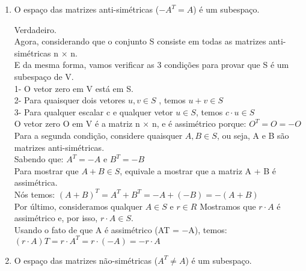 \documentclass[leqno]{article}
\numberwithin{equation}{section}
\begin{document}
\begin{enumerate}
\begin{enumerate}
			\item O espaço das matrizes anti-simétricas ($-A^T = A$) é um subespaço.
			
			\begin{sol} 
				Verdadeiro.\\
				\newline
				Agora, considerando que o conjunto S consiste em todas as matrizes anti-simétricas n × n.\\
				E da mesma forma, vamos verificar as 3 condições para provar que S é um subespaço de V.\\
				1- O vetor zero em V está em S.\\
				2- Para quaisquer dois vetores $u, v \in S$ , temos $u + v \in S$\\
				3- Para qualquer escalar c e qualquer vetor $u \in S$, temos $c \cdot u \in S$\\	
				\newline
				O vetor zero O em V é a matriz n × n, e é assimétrico porque: $O^T = O = −O$\\
				\newline
				Para a segunda condição, considere quaisquer $A, B \in S$, ou seja, A e B são matrizes anti-simétricas.\\
				Sabendo que: $A^T= −A$ e $B^T = −B$\\
				Para mostrar que $A + B \in S$, equivale a mostrar que a matriz A + B é assimétrica.\\
				Nós temos:
				$(A + B)^T = A^T + B^T = -A + (-B) = -(A + B)$\\
				\newline
				Por último, consideramos qualquer $A \in S$ e $r \in R$
				Mostramos que $r \cdot A$ é assimétrico e, por isso, $r \cdot A \in S$.\\
				\newline
				Usando o fato de que A é assimétrico (AT = −A), temos:\\
				$(r \cdot A) T = r \cdot A^T = r \cdot (−A) = -r \cdot A$
				\newline
			\end{sol} 
			
			\item O espaço das matrizes não-simétricas ($A^T \neq A$) é um subespaço.
			

\end{enumerate}
\end{enumerate}
\end{document}
